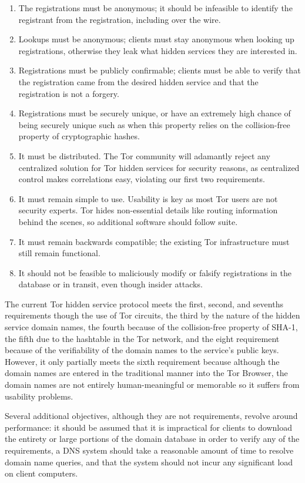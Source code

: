 \begin{enumerate}
	\item The registrations must be anonymous; it should be infeasible to identify the registrant from the registration, including over the wire.
	\item Lookups must be anonymous; clients must stay anonymous when looking up registrations, otherwise they leak what hidden services they are interested in.
	\item Registrations must be publicly confirmable; clients must be able to verify that the registration came from the desired hidden service and that the registration is not a forgery.
	\item Registrations must be securely unique, or have an extremely high chance of being securely unique such as when this property relies on the collision-free property of cryptographic hashes.
	\item It must be distributed. The Tor community will adamantly reject any centralized solution for Tor hidden services for security reasons, as centralized control makes correlations easy, violating our first two requirements.
	\item It must remain simple to use. Usability is key as most Tor users are not security experts. Tor hides non-essential details like routing information behind the scenes, so additional software should follow suite.
	\item It must remain backwards compatible; the existing Tor infrastructure must still remain functional.
	\item It should not be feasible to maliciously modify or falsify registrations in the database or in transit, even though insider attacks.
\end{enumerate}

The current Tor hidden service protocol meets the first, second, and sevenths requirements though the use of Tor circuits, the third by the nature of the hidden service domain names, the fourth because of the collision-free property of SHA-1, the fifth due to the hashtable in the Tor network, and the eight requirement because of the verifiability of the domain names to the service's public keys. However, it only partially meets the sixth requirement because although the domain names are entered in the traditional manner into the Tor Browser, the domain names are not entirely human-meaningful or memorable so it suffers from usability problems. 

Several additional objectives, although they are not requirements, revolve around performance: it should be assumed that it is impractical for clients to download the entirety or large portions of the domain database in order to verify any of the requirements, a DNS system should take a reasonable amount of time to resolve domain name queries, and that the system should not incur any significant load on client computers.